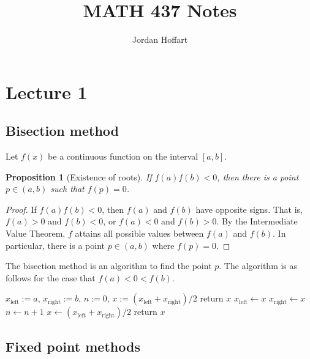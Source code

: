 \documentclass{article}
\title{MATH 437 Notes}
\author{Jordan Hoffart}
\date{}
\theoremstyle{plain}
\newtheorem{proposition}{Proposition}
\theoremstyle{definition}
\begin{document}
\maketitle


\tableofcontents

\section{Lecture 1}

\subsection{Bisection method}

Let $f(x)$ be a continuous function on the interval $[a,b]$.

\begin{proposition}[Existence of roots]
  If $f(a)f(b) < 0$, then there is a point $p \in (a,b)$ such that $f(p) = 0$.
\end{proposition}
\begin{proof}
  If $f(a)f(b) < 0$, then $f(a)$ and $f(b)$ have opposite signs.
  That is, $f(a) > 0$ and $f(b) < 0$, or $f(a) < 0$ and $f(b) > 0$.
  By the Intermediate Value Theorem, $f$ attains all possible values between $f(a)$ and $f(b)$.
  In particular, there is a point $p \in (a,b)$ where $f(p) = 0$.
\end{proof}

The bisection method is an algorithm to find the point $p$.
The algorithm is as follows for the case that $f(a) < 0 < f(b)$.
\begin{algorithm}[H]
  \caption{Bisection method}
  \begin{algorithmic}[1]
    \State $x_{\text{left}} := a$, $x_{\text{right}} := b$, $n := 0$, $x := (x_{\text{left}} + x_{\text{right}}) / 2$
    \State return $x$
    \State $x_{\text{left}} \gets x$
    \Else
    \State $x_{\text{right}} \gets x$
    \EndIf
    \State $n \gets n+1$
    \State $x \gets (x_{\text{left}} + x_{\text{right}}) / 2$
    \EndWhile
    \State return $x$
  \end{algorithmic}
\end{algorithm}


\subsection{Fixed point methods}
\end{document}

